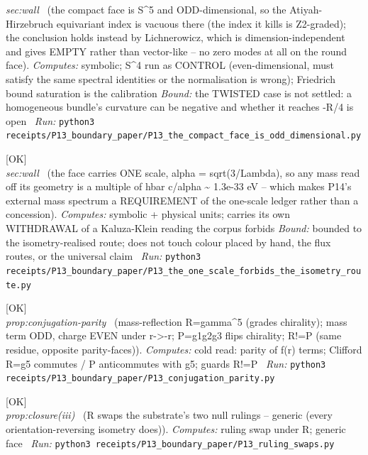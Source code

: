 \begin{description}
\textit{sec:wall} \ (the compact face is S\textasciicircum{}5 and ODD-dimensional, so the Atiyah-Hirzebruch equivariant index is vacuous there (the index it kills is Z2-graded); the conclusion holds instead by Lichnerowicz, which is dimension-independent and gives EMPTY rather than vector-like -- no zero modes at all on the round face). 
\emph{Computes:} symbolic; S\textasciicircum{}4 run as CONTROL (even-dimensional, must satisfy the same spectral identities or the normalisation is wrong); Friedrich bound saturation is the calibration
 \emph{Bound:} the TWISTED case is not settled: a homogeneous bundle's curvature can be negative and whether it reaches -R/4 is open
\ \emph{Run:} \texttt{python3 receipts/P13\_boundary\_paper/P13\_the\_compact\_face\_is\_odd\_dimensional.py}
\item[\label{rcpt:P13_the_one_scale_forbids_the_isometry_route}\texttt{P13\_the\_one\_scale\_forbids\_the\_isometry\_route}]\hfill\textsf{[OK]}\\
\textit{sec:wall} \ (the face carries ONE scale, alpha = sqrt(3/Lambda), so any mass read off its geometry is a multiple of hbar c/alpha \textasciitilde{} 1.3e-33 eV -- which makes P14's external mass spectrum a REQUIREMENT of the one-scale ledger rather than a concession). 
\emph{Computes:} symbolic + physical units; carries its own WITHDRAWAL of a Kaluza-Klein reading the corpus forbids
 \emph{Bound:} bounded to the isometry-realised route; does not touch colour placed by hand, the flux routes, or the universal claim
\ \emph{Run:} \texttt{python3 receipts/P13\_boundary\_paper/P13\_the\_one\_scale\_forbids\_the\_isometry\_route.py}
\item[\label{rcpt:P13_conjugation_parity}\texttt{P13\_conjugation\_parity}]\hfill\textsf{[OK]}\\
\textit{prop:conjugation-parity} \ (mass-reflection R=gamma\textasciicircum{}5 (grades chirality); mass term ODD, charge EVEN under r->-r; P=g1g2g3 flips chirality; R!=P (same residue, opposite parity-faces)). 
\emph{Computes:} cold read: parity of f(r) terms; Clifford R=g5 commutes / P anticommutes with g5; guards R!=P
\ \emph{Run:} \texttt{python3 receipts/P13\_boundary\_paper/P13\_conjugation\_parity.py}
\item[\label{rcpt:P13_ruling_swaps}\texttt{P13\_ruling\_swaps}]\hfill\textsf{[OK]}\\
\textit{prop:closure(iii)} \ (R swaps the substrate's two null rulings -- generic (every orientation-reversing isometry does)). 
\emph{Computes:} ruling swap under R; generic face
\ \emph{Run:} \texttt{python3 receipts/P13\_boundary\_paper/P13\_ruling\_swaps.py}

\end{description}
